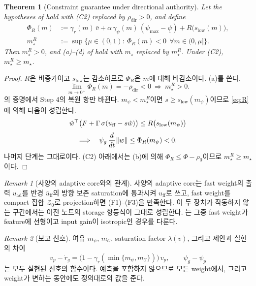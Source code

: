 \documentclass[11pt]{article}\usepackage[margin=1in]{geometry}\usepackage{amsmath,amssymb,amsthm,mathtools}\usepackage{graphicx}\graphicspath{{figures/}{../figures/}{figs/}{./}}\usepackage{enumitem}\usepackage{hyperref}\usepackage{cleveref}\usepackage{tikz}\usetikzlibrary{arrows.meta,positioning,calc,shapes.geometric}\usepackage{float}\usepackage[most]{tcolorbox}\usepackage{kotex}\usepackage{booktabs}\emergencystretch=1.6em\tolerance=2000 \crefname{assumption}{Assumption}{Assumptions}\Crefname{assumption}{Assumption}{Assumptions}\crefname{definition}{Definition}{Definitions}\Crefname{definition}{Definition}{Definitions}\crefname{proposition}{Proposition}{Propositions}\Crefname{proposition}{Proposition}{Propositions}\crefname{fact}{Fact}{Facts}\Crefname{fact}{Fact}{Facts} \newtheorem{assumption}{Assumption}\newtheorem{definition}{Definition}\newtheorem{lemma}{Lemma}\newtheorem{proposition}{Proposition}\newtheorem{theorem}{Theorem}\newtheorem{corollary}{Corollary}\newtheorem{fact}{Fact}\theoremstyle{remark}\newtheorem{remark}{Remark} \newcommand{\R}{\mathbb{R}}\newcommand{\U}{\mathcal U}
\newcommand{\Cset}{\mathcal C}\newcommand{\Pcl}{\mathcal P}\newcommand{\Zset}{\mathcal Z_0}\newcommand{\Xset}{\mathcal X_0}
\begin{document}
\begin{theorem}[Constraint guarantee under directional authority]
\label{thm:dir}
Let the hypotheses of  hold with (C2) replaced by $\rho_{\mathrm{dir}}>0$, and define
\begin{align*}
\Phi_R(m)&:=\gamma_r(m)\,\bar v+\alpha\,\gamma_\psi(m)\,(\psi_{\max}-\underline\psi)+R\big(s_{\mathrm{low}}(m)\big),\\
m_\star^R&:=\sup\big\{\mu\in(0,1):\ \Phi_R(m)<0\ \ \forall m\in(0,\mu]\big\}.
\end{align*}
Then $m_\star^R>0$, and (a)--(d) of  hold with $m_\star$ replaced by $m_\star^R$. Under (C2), $m_\star^R\ge m_\star$.
\end{theorem}

\begin{proof}
$R$은 비증가이고 $s_{\mathrm{low}}$는 감소하므로 $\Phi_R$은 $m$에 대해 비감소이다. (a)를 쓴다.
\[
\lim_{m\to0^+}\Phi_R(m)=-\rho_{\mathrm{dir}}<0\ \Longrightarrow\ m_\star^R>0 .
\]
의 증명에서 Step 4의 복원 항만 바뀐다. $m_\psi<m_\star^R$이면 $s\ge s_{\mathrm{low}}(m_\psi)$이므로 \eqref{eq:R}에 의해 다음이 성립한다.
\[
\hat w^\top\big(F+\Gamma\,\sigma(u_{\mathrm{ff}}-s\hat w)\big)\le R\big(s_{\mathrm{low}}(m_\psi)\big)
\]
\[
\Longrightarrow\quad \psi_g\,\frac{d}{dt}\lVert w\rVert\le\Phi_R(m_\psi)<0 .
\]
나머지 단계는 그대로이다. (C2) 아래에서는 (b)에 의해 $\Phi_R\le\Phi-\rho_0$이므로 $m_\star^R\ge m_\star$이다.
\end{proof}

\begin{remark}[사양의 adaptive core와의 관계]
\label{rem:core}
사양의 adaptive core는 fast weight의 출력 $u_{\mathrm{ad}}$를 반경 $\bar u_{\mathrm{ff}}$의 방향 보존 saturation에 통과시켜 $u_{\mathrm{ff}}$로 쓰고, fast weight를 compact 집합 $\Zset$로 projection하면 (F1)--(F3)을 만족한다. 이 두 장치가 작동하지 않는 구간에서는 이전 노트의 storage 항등식이 그대로 성립한다. 는 그중 fast weight가 feature에 선형이고 input gain이 isotropic인 경우를 다룬다.
\end{remark}

\begin{remark}[보고 신호]
\label{rem:report}
여유 $m_\psi$, $m_{\Cset}$, saturation factor $\lambda(v)$, 그리고 제안과 실현의 차이
\[
v_p-\dot r_g=\big(1-\gamma_r(\min\{m_\psi,m_{\Cset}\})\big)\,v_p,\qquad \psi_g-\psi_p
\]
는 모두 실현된 신호의 함수이다. 예측을 포함하지 않으므로 모든 weight에서, 그리고 weight가 변하는 동안에도 정의대로의 값을 준다.
\end{remark}
\end{document}
